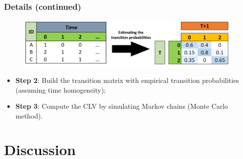 \documentclass[aspectratio=169,xcolor=x11names,compress]{beamer}
\begin{document}
\begin{frame}
\frametitle{Details (continued)}

\begin{figure}
	\includegraphics[scale = 0.4]{transitions.jpg}
\end{figure}
	
\begin{itemize}
	\item \textbf{Step 2}: Build the transition matrix with empirical transition probabilities (assuming time homogeneity);
	\item \textbf{Step 3}: Compute the CLV by simulating Markov chains (Monte Carlo method).
\end{itemize}
\end{frame}

\section{Discussion}
\end{document}
